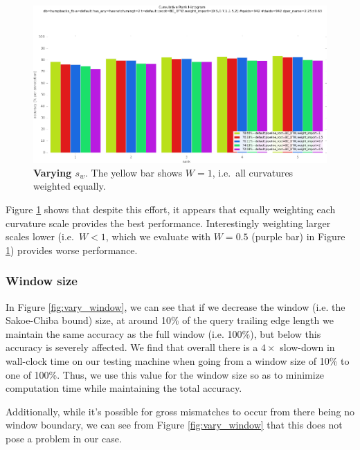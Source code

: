 \begin{figure}[t]%
\centering
\includegraphics[width=1\textwidth]{../images/results/vary_weight_import.png}
\caption[]{\textbf{Varying $s_w$}. The yellow bar shows $W = 1$, i.e.\ all curvatures weighted equally.}
\label{fig:vary_weight_import}
\end{figure}



Figure \ref{fig:vary_weight_import} shows that despite this effort, it appears that equally weighting each curvature scale provides the best performance.
Interestingly weighting larger scales lower (i.e.\ $W < 1$, which we evaluate with $W = 0.5$ (purple bar) in Figure \ref{fig:vary_weight_import}) provides worse performance.

\subsubsection{Window size}

In Figure \ref{fig:vary_window}, we can see that if we decrease the window (i.e. the Sakoe-Chiba bound) size, at around 10\% of the query trailing edge length we maintain the same accuracy as the full window (i.e. 100\%), but below this accuracy is severely affected.
We find that overall there is a $4\times$ slow-down in wall-clock time on our testing machine when going from a window size of 10\% to one of 100\%. 
Thus, we use this value for the window size so as to minimize computation time while maintaining the total accuracy.

Additionally, while it's possible for gross mismatches to occur from there being no window boundary, we can see from Figure \ref{fig:vary_window} that this does not pose a problem in our case.

